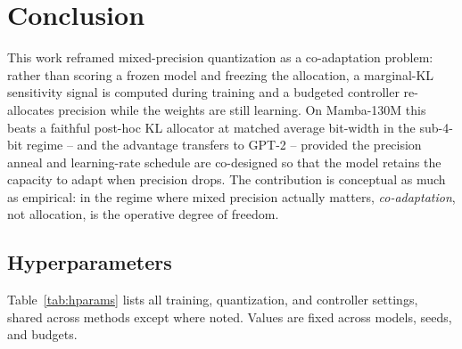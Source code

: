 \documentclass[conference]{IEEEtran}
\begin{document}
\section{Conclusion}
This work reframed mixed-precision quantization as a co-adaptation problem:
rather than scoring a frozen model and freezing the allocation, a
marginal-KL sensitivity signal is computed during training and a budgeted controller
re-allocates precision while the weights are still learning. On Mamba-130M this
beats a faithful post-hoc KL allocator at matched average bit-width in the
sub-4-bit regime -- and the advantage transfers to GPT-2 -- provided the precision
anneal and learning-rate schedule are co-designed so that the model retains the
capacity to adapt when precision drops.
The contribution is conceptual as much as empirical: in the regime where mixed
precision actually matters, \emph{co-adaptation}, not allocation, is the
operative degree of freedom.

\appendix

\subsection{Hyperparameters}
Table~\ref{tab:hparams} lists all training, quantization, and controller settings,
shared across methods except where noted. Values are fixed across models, seeds,
and budgets.
\end{document}
